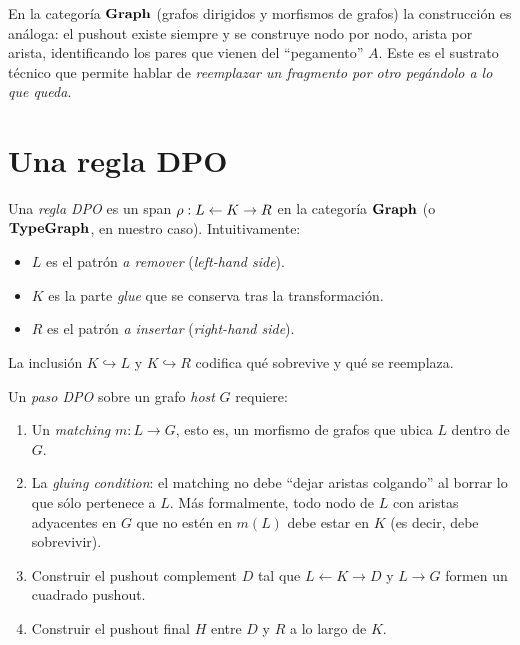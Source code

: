 En la categoría $\mathbf{Graph}$ (grafos dirigidos y morfismos de grafos) la
construcción es análoga: el pushout existe siempre y se construye nodo
por nodo, arista por arista, identificando los pares que vienen del
``pegamento'' $A$. Este es el sustrato técnico que permite hablar de
\emph{reemplazar un fragmento por otro pegándolo a lo que queda}.

\section{Una regla DPO}

\begin{defn}
\label{def:dpo-rule}
Una \emph{regla DPO} es un span
$\rho: L \leftarrow K \rightarrow R$ en la categoría $\mathbf{Graph}$ (o $\mathbf{TypeGraph}$, en nuestro
caso). Intuitivamente:
\begin{itemize}
  \item $L$ es el patrón \emph{a remover} (\emph{left-hand side}).
  \item $K$ es la parte \emph{glue} que se conserva tras la
    transformación.
  \item $R$ es el patrón \emph{a insertar} (\emph{right-hand side}).
\end{itemize}
La inclusión $K \hookrightarrow L$ y $K \hookrightarrow R$ codifica qué
sobrevive y qué se reemplaza.
\end{defn}

Un \emph{paso DPO} sobre un grafo \emph{host} $G$ requiere:

\begin{enumerate}
  \item Un \emph{matching} $m: L \to G$, esto es, un morfismo de
    grafos que ubica $L$ dentro de $G$.
  \item La \emph{gluing condition}: el matching no debe ``dejar
    aristas colgando'' al borrar lo que sólo pertenece a $L$. Más
    formalmente, todo nodo de $L$ con aristas adyacentes en $G$ que no
    estén en $m(L)$ debe estar en $K$ (es decir, debe sobrevivir).
  \item Construir el pushout complement $D$ tal que $L \leftarrow K
    \rightarrow D$ y $L \rightarrow G$ formen un cuadrado pushout.
  \item Construir el pushout final $H$ entre $D$ y $R$ a lo largo de
    $K$.
\end{enumerate}


